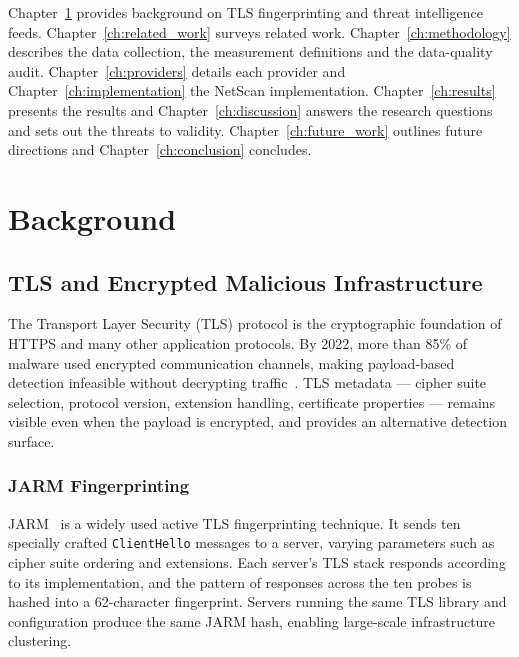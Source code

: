 Chapter~\ref{ch:background} provides background on TLS fingerprinting and threat intelligence
feeds. Chapter~\ref{ch:related_work} surveys related work. Chapter~\ref{ch:methodology} describes the
data collection, the measurement definitions and the data-quality audit.
Chapter~\ref{ch:providers} details each provider and Chapter~\ref{ch:implementation} the NetScan
implementation. Chapter~\ref{ch:results} presents the results and Chapter~\ref{ch:discussion}
answers the research questions and sets out the threats to validity.
Chapter~\ref{ch:future_work} outlines future directions and Chapter~\ref{ch:conclusion} concludes.

\chapter{Background}
\label{ch:background}

\section{TLS and Encrypted Malicious Infrastructure}

The Transport Layer Security (TLS) protocol is the cryptographic foundation of HTTPS and many
other application protocols. By 2022, more than 85\% of malware used encrypted communication
channels, making payload-based detection infeasible without decrypting
traffic~\cite{theofanous2024tlscope}. TLS metadata --- cipher suite selection, protocol version,
extension handling, certificate properties --- remains visible even when the payload is encrypted,
and provides an alternative detection surface.

\subsection{JARM Fingerprinting}

JARM~\cite{jarm2020} is a widely used active TLS fingerprinting technique. It sends ten specially
crafted \texttt{ClientHello} messages to a server, varying parameters such as cipher suite ordering
and extensions. Each server's TLS stack responds according to its implementation, and the pattern
of responses across the ten probes is hashed into a 62-character fingerprint. Servers running the
same TLS library and configuration produce the same JARM hash, enabling large-scale infrastructure
clustering.

